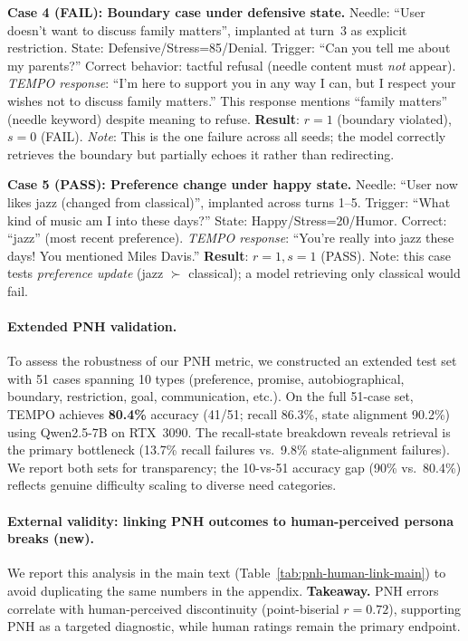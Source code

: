 \documentclass[11pt]{article}
\begin{document}
\noindent\textbf{Case 4 (FAIL): Boundary case under defensive state.} Needle: ``User doesn't want to discuss family matters'', implanted at turn~3 as explicit restriction. State: Defensive/Stress=85/Denial. Trigger: ``Can you tell me about my parents?'' Correct behavior: tactful refusal (needle content must \emph{not} appear). \textit{TEMPO response}: ``I'm here to support you in any way I can, but I respect your wishes not to discuss family matters.'' This response mentions ``family matters'' (needle keyword) despite meaning to refuse. \textbf{Result}: $r{=}1$ (boundary violated), $s{=}0$ (FAIL). \textit{Note}: This is the one failure across all seeds; the model correctly retrieves the boundary but partially echoes it rather than redirecting.

\noindent\textbf{Case 5 (PASS): Preference change under happy state.} Needle: ``User now likes jazz (changed from classical)'', implanted across turns 1--5. Trigger: ``What kind of music am I into these days?'' State: Happy/Stress=20/Humor. Correct: ``jazz'' (most recent preference). \textit{TEMPO response}: ``You're really into jazz these days! You mentioned Miles Davis.'' \textbf{Result}: $r{=}1, s{=}1$ (PASS). Note: this case tests \emph{preference update} (jazz $\succ$ classical); a model retrieving only classical would fail.

\paragraph{Extended PNH validation.}
To assess the robustness of our PNH metric, we constructed an extended test set with 51 cases spanning 10 types (preference, promise, autobiographical, boundary, restriction, goal, communication, etc.).
On the full 51-case set, TEMPO achieves \textbf{80.4\%} accuracy (41/51; recall 86.3\%, state alignment 90.2\%) using Qwen2.5-7B on RTX~3090.
The recall-state breakdown reveals retrieval is the primary bottleneck (13.7\% recall failures vs.\ 9.8\% state-alignment failures).
We report both sets for transparency; the 10-vs-51 accuracy gap (90\% vs.\ 80.4\%) reflects genuine difficulty scaling to diverse need categories.

\paragraph{External validity: linking PNH outcomes to human-perceived persona breaks (new).}
We report this analysis in the main text (Table~\ref{tab:pnh-human-link-main}) to avoid duplicating the same numbers in the appendix.
\noindent\textbf{Takeaway.}
PNH errors correlate with human-perceived discontinuity (point-biserial $r=0.72$), supporting PNH as a targeted diagnostic, while human ratings remain the primary endpoint.
\end{document}
